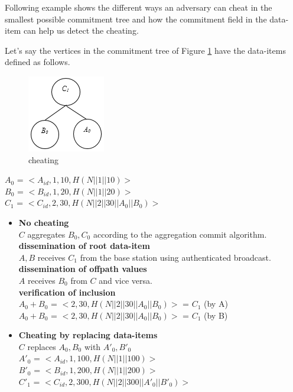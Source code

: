 	Following example shows the different ways an adversary can cheat in the smallest possible commitment tree and how the commitment field in the data-item can help us detect the cheating.
\begin{exmp}
	Let's say the vertices in the commitment tree of Figure \ref{fig:cheating} have the data-items defined as follows.\\
	\begin{figure}[t]
		\centering
		\includegraphics{images/commitment-tree-2.png}
		\caption{cheating}
		\label{fig:cheating}
	\end{figure}	
	$A_{0}$ = $<A_{id},1,10, H(N||1||10)>$\\
	$B_{0}$ = $<B_{id},1,20, H(N||1||20)>$\\
	$C_{1}$ = $<C_{id},2,30, H(N||2||30||A_{0}||B_{0})>$
	\begin{itemize}
	\item \textbf{No cheating}\\
		$C$ aggregates $B_{0},C_{0}$ according to the aggregation commit algorithm.\\
		\textbf{dissemination of root data-item}\\
			$A,B$ receives $C_{1}$ from the base station using authenticated broadcast.\\
		\textbf{dissemination of offpath values}\\
			$A$ receives $B_{0}$ from $C$ and vice versa.\\
		\textbf{verification of inclusion}\\
			$A_{0} + B_{0}$ = $<2,30,H(N||2||30||A_{0}||B_{0})>$ = $C_{1}$ (by A)\\
			$A_{0} + B_{0}$ = $<2,30,H(N||2||30||A_{0}||B_{0})>$ = $C_{1}$ (by B)
	\item \textbf{Cheating by replacing data-items}\\
		$C$ replaces $A_{0},B_{0}$ with $A'_{0},B'_{0}$\\
		$A'_{0}$ = $<A_{id},1,100, H(N||1||100)>$\\
		$B'_{0}$ = $<B_{id},1,200, H(N||1||200)>$\\
		$C'_{1}$ = $<C_{id},2,300, H(N||2||300||A'_{0}||B'_{0})>$\\

\end{itemize}
\end{exmp}
